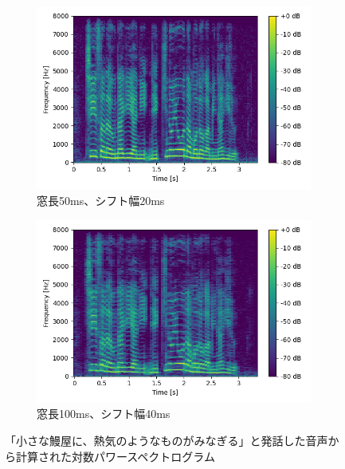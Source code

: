 \documentclass[12pt]{jarticle}
\numberwithin{equation}{section}    %
\numberwithin{figure}{section}      %
\numberwithin{table}{section}      %
\begin{document}
\begin{figure}[tb]
    \vspace{0.5cm}

    \begin{subfigure}[b]{0.48\textwidth}
        \centering
        \includegraphics[width=\textwidth]{./figure/sec2/spectrogram_4.png}
        \caption{窓長50ms、シフト幅20ms}
        \label{sec2:fig:spectrogram3}
    \end{subfigure}
    \begin{subfigure}[b]{0.48\textwidth}
        \centering
        \includegraphics[width=\textwidth]{./figure/sec2/spectrogram_8.png}
        \caption{窓長100ms、シフト幅40ms}
        \label{sec2:fig:spectrogram4}
    \end{subfigure}
    \caption{「小さな鰻屋に、熱気のようなものがみなぎる」と発話した音声から計算された対数パワースペクトログラム}
    \label{sec2:fig:log_power_spectrograms}
\end{figure}
\end{document}
